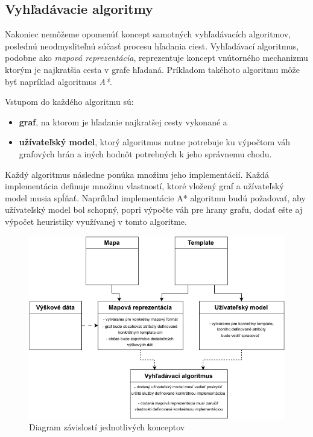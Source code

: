\subsection{Vyhľadávacie algoritmy}

Nakoniec nemôžeme opomenúť koncept samotných vyhľadávacích algoritmov, poslednú neodmysliteľnú súčasť procesu hľadania ciest. Vyhľadávací algoritmus, podobne ako \textit{mapová reprezentácia}, reprezentuje koncept vnútorného mechanizmu ktorým je najkratšia cesta v grafe hľadaná. Príkladom takéhoto algoritmu môže byť napríklad algoritmus \textit{A*}. 

Vstupom do každého algoritmu sú:
\begin{itemize}
    \item \textbf{graf}, na ktorom je hľadanie najkratšej cesty vykonané a 
    \item \textbf{užívateľský model}, ktorý algoritmus nutne potrebuje ku výpočtom váh grafových hrán a iných hodnôt potrebných k jeho správnemu chodu.  
\end{itemize}
  
Každý algoritmus následne ponúka množinu jeho implementácií. Každá implementácia definuje množinu vlastností, ktoré vložený graf a užívateľský model musia spĺňať. Napríklad implementácie A* algoritmu budú požadovať, aby užívateľský model bol schopný, popri výpočte váh pre hrany grafu, dodať ešte aj výpočet heuristiky využívanej v tomto algoritme.


\begin{figure}[h]\centering
\includegraphics[]{img/konceptove_zavislosti}
\caption{Diagram závislostí jednotlivých konceptov} 
\label{obr01:konceptove_zavislosti}
\end{figure}

